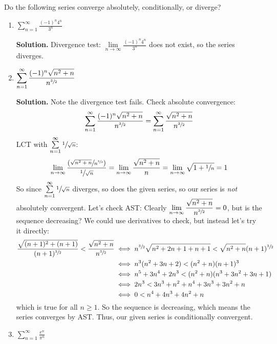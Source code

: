 \begin{Example}{}{}
    Do the following series converge absolutely, conditionally, or diverge?
    \begin{enumerate}
        \item $ \displaystyle \sum\limits_{n=1}^{\infty} \frac{(-1)^n4^n}{3^n} $

              \textbf{Solution.} Divergence test: $ \displaystyle \lim\limits_{{n} \to {\infty}}
                  \frac{(-1)^n4^n}{3^n} $ does not exist, so the series diverges.
        \item $ \displaystyle \sum\limits_{n=1}^{\infty} \frac{(-1)^n\sqrt{n^2+n}}{n^{\sfrac{3}{2}}} $

              \textbf{Solution.} Note the divergence test fails. Check absolute convergence:
              \[ \sum\limits_{n=1}^{\infty} \frac{(-1)^n\sqrt{n^2+n}}{n^{\sfrac{3}{2}}}=
                  \sum\limits_{n=1}^{\infty}\frac{\sqrt{n^2+n}}{n^{\sfrac{3}{2}}} \]
              LCT with $ \sum\limits_{n=1}^{\infty} \sfrac{1}{\sqrt{n}} $:
              \[ \lim\limits_{{n} \to {\infty}}
                  \frac{\left( \sfrac{\sqrt{n^2+n}}{n^{\sfrac{3}{2}}} \right)}{\sfrac{1}{\sqrt{n}}}
                  =\lim\limits_{{n} \to {\infty}} \frac{\sqrt{n^2+n}}{n}
                  =\lim\limits_{{n} \to {\infty}}\sqrt{1+\sfrac{1}{n}}=1 \]
              So since $ \sum\limits_{n=1}^{\infty} \sfrac{1}{\sqrt{n}} $ diverges, so does
              the given series, so our series is \emph{not} absolutely convergent. Let's check
              AST\@: Clearly $ \displaystyle \lim\limits_{{n} \to {\infty}} \frac{\sqrt{n^2+n}}{n^{\sfrac{3}{2}}}=0 $,
              but is the sequence decreasing? We could use derivatives to check, but instead let's try
              it directly:
              \begin{align*}
                  \frac{\sqrt{(n+1)^2+(n+1)}}{(n+1)^{\sfrac{3}{2}}}<\frac{\sqrt{n^2+n}}{n^{\sfrac{3}{2}}}
                   & \iff n^{\sfrac{3}{2}}\sqrt{n^2+2n+1+n+1}<\sqrt{n^2+n}(n+1)^{\sfrac{3}{2}} \\
                   & \iff n^3(n^2+3n+2)<(n^2+n)(n+1)^3                                         \\
                   & \iff n^5+3n^4+2n^3<(n^2+n)(n^3+3n^2+3n+1)                                 \\
                   & \iff 2n^3<3n^3+n^2+n^4+3n^3+3n^2+n                                        \\
                   & \iff 0<n^4+4n^3+4n^2+n
              \end{align*}
              which is true for all $ n\geqslant 1 $. So the sequence is decreasing, which means
              the series converges by AST\@. Thus, our given series is conditionally convergent.
        \item $ \displaystyle \sum\limits_{n=1}^{\infty} \frac{e^n}{\pi^n} $


\end{enumerate}
\end{Example}
